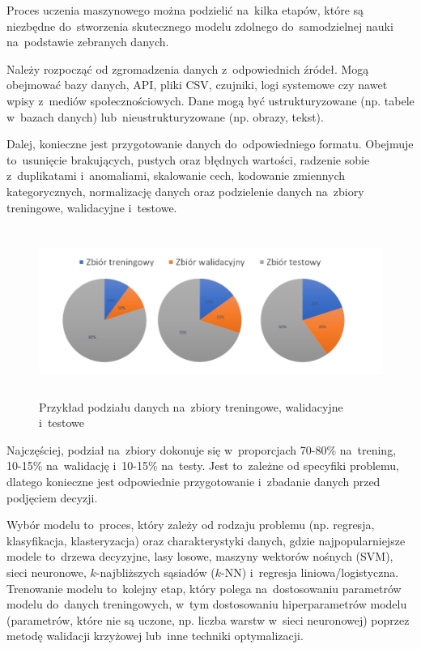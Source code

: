 Proces uczenia maszynowego można podzielić na~kilka etapów,
które są niezbędne do~stworzenia skutecznego modelu zdolnego do~samodzielnej nauki na~podstawie zebranych danych.

Należy rozpocząć od zgromadzenia danych z~odpowiednich źródeł.
Mogą obejmować bazy danych, API, pliki CSV, czujniki, logi systemowe czy nawet wpisy z~mediów społecznościowych.
Dane mogą być ustrukturyzowane (np. tabele w~bazach danych) lub~nieustrukturyzowane (np. obrazy, tekst).

Dalej, konieczne jest przygotowanie danych do~odpowiedniego formatu.
Obejmuje to~usunięcie brakujących, pustych oraz błędnych wartości,
radzenie sobie z~duplikatami i~anomaliami, skalowanie cech, kodowanie zmiennych kategorycznych,
normalizację danych oraz podzielenie danych na~zbiory treningowe, walidacyjne i~testowe.

\begin{figure}[ht]
	\centering
	\includegraphics[height=5.5cm]{resources/machine-learning/images/process_1.png}
	\caption{Przykład podziału danych na~zbiory treningowe, walidacyjne i~testowe}
    \label{Fig:ml-process-1}
\end{figure}
\FloatBarrier

Najczęściej, podział na~zbiory dokonuje się w~proporcjach 70-80\% na~trening, 10-15\% na~walidację i~10-15\% na~testy.
Jest to~zależne od specyfiki problemu,
dlatego konieczne jest odpowiednie przygotowanie i~zbadanie danych przed podjęciem decyzji.

Wybór modelu to~proces, który zależy od rodzaju problemu (np. regresja, klasyfikacja, klasteryzacja)
oraz charakterystyki danych, gdzie najpopularniejsze modele to~drzewa decyzyjne,
lasy losowe, maszyny wektorów nośnych (SVM), sieci neuronowe, $k$-najbliższych sąsiadów ($k$-NN)
i~regresja liniowa/logistyczna. Trenowanie modelu to~kolejny etap,
który polega na~dostosowaniu parametrów modelu do~danych treningowych,
w~tym dostosowaniu hiperparametrów modelu (parametrów, które nie są uczone,
np. liczba warstw w~sieci neuronowej) poprzez metodę walidacji krzyżowej lub~inne techniki optymalizacji.

